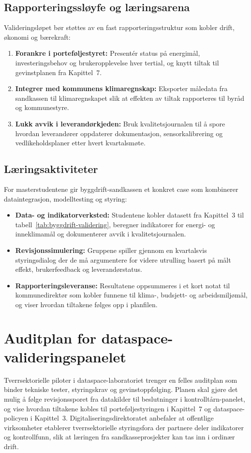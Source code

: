 \subsection{Rapporteringssløyfe og læringsarena}
Valideringsløpet bør støttes av en fast rapporteringsstruktur som kobler drift, økonomi og bærekraft:
\begin{enumerate}
    \item \textbf{Forankre i porteføljestyret:} Presentér status på energimål, investeringsbehov og brukeropplevelse hver tertial, og knytt tiltak til gevinstplanen fra Kapittel~7.\citep{ks2024eiendomsdrift}
    \item \textbf{Integrer med kommunens klimaregnskap:} Eksporter måledata fra sandkassen til klimaregnskapet slik at effekten av tiltak rapporteres til byråd og kommunestyre.\citep{oslo2024klimaeiendom}
    \item \textbf{Lukk avvik i leverandørkjeden:} Bruk kvalitetsjournalen til å spore hvordan leverandører oppdaterer dokumentasjon, sensorkalibrering og vedlikeholdsplaner etter hvert kvartalsmøte.\citep{statsbygg2023digitalmodenhet}
\end{enumerate}

\subsection{Læringsaktiviteter}
For masterstudentene gir byggdrift-sandkassen et konkret case som kombinerer dataintegrasjon, modelltesting og styring:
\begin{itemize}
    \item \textbf{Data- og indikatorverksted:} Studentene kobler datasett fra Kapittel~3 til tabell~\ref{tab:byggdrift-validering}, beregner indikatorer for energi- og inneklimamål og dokumenterer avvik i kvalitetsjournalen.
    \item \textbf{Revisjonssimulering:} Gruppene spiller gjennom en kvartalsvis styringsdialog der de må argumentere for videre utrulling basert på målt effekt, brukerfeedback og leverandørstatus.
    \item \textbf{Rapporteringsleveranse:} Resultatene oppsummeres i et kort notat til kommunedirektør som kobler funnene til klima-, budsjett- og arbeidsmiljømål, og viser hvordan tiltakene følges opp i planfilen.
\end{itemize}

\section{Auditplan for dataspace-valideringspanelet}
Tverrsektorielle piloter i dataspace-laboratoriet trenger en felles auditplan som binder tekniske tester, styringskrav og gevinstoppfølging.\citep{iso19011-2018,dfo2024internkontroll} Planen skal gjøre det mulig å følge revisjonssporet fra datakilder til beslutninger i kontrolltårn-panelet, og vise hvordan tiltakene kobles til porteføljestyringen i Kapittel~7 og dataspace-policyen i Kapittel~3. Digitaliseringsdirektoratet anbefaler at offentlige virksomheter etablerer tverrsektorielle styringsfora der partnere deler indikatorer og kontrollfunn, slik at læringen fra sandkasseprosjekter kan tas inn i ordinær drift.\citep{digdir2024samstyring}

